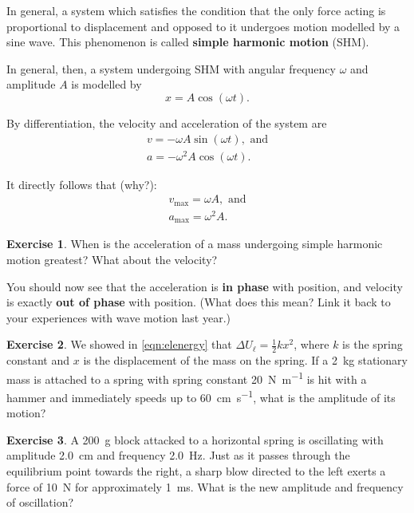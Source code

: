 \documentclass[a4paper]{amsbook}
\theoremstyle{definition}
\newtheorem{exercise}{Exercise}
\numberwithin{exercise}{chapter}
\numberwithin{exercise}{chapter}
\begin{document}
In general, a system which satisfies the condition that the only force acting is proportional to displacement and opposed to
it undergoes motion modelled by a sine wave. This phenomenon is called \textbf{simple harmonic motion} (SHM).

In general, then, a system undergoing SHM with angular frequency $ \omega $ and amplitude $ A $ is modelled by
\begin{equation}
  x = A \cos (\omega t).
\end{equation}

By differentiation, the velocity and acceleration of the system are
\begin{gather}
  v = -\omega A \sin (\omega t), \text{ and}\\
  a = -\omega^2 A \cos (\omega t).
\end{gather}

It directly follows that (why?):
\begin{gather}
  v_\text{max} = \omega A, \text{ and}\\
  a_\text{max} = \omega^2 A.
\end{gather}

\begin{exercise}
  When is the acceleration of a mass undergoing simple harmonic motion greatest? What about the velocity?
\end{exercise}

You should now see that the acceleration is \textbf{in phase} with position, and velocity is exactly \textbf{out of phase}
with position. (What does this mean? Link it back to your experiences with wave motion last year.)

\begin{exercise}
  We showed in \cref{eqn:elenergy} that $ \Delta U_{\ell} = \frac{1}{2} kx^2 $, where $ k $ is the spring constant and $ x $ is the displacement
  of the mass on the spring. If a \SI{2}{\kilo\gram} stationary mass is attached to a spring with spring constant \SI{20}{\newton\per\metre} is
  hit with a hammer and immediately speeds up to \SI{60}{\centi\metre\per\second}, what is the amplitude of its motion?
\end{exercise}

\begin{exercise}
  A \SI{200}{\gram} block attacked to a horizontal spring is oscillating with amplitude \SI{2.0}{\centi\metre} and frequency \SI{2.0}{\hertz}.
  Just as it passes through the equilibrium point towards the right, a sharp blow directed to the left exerts a force of \SI{10}{\newton} for
  approximately \SI{1}{\milli\second}. What is the new amplitude and frequency of oscillation?
\end{exercise}
\end{document}
